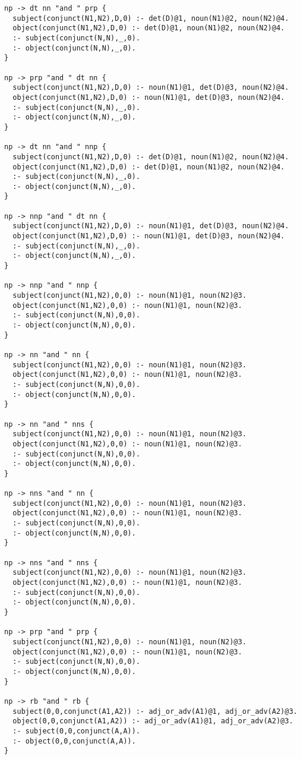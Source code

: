 \begin{lstlisting}
np -> dt nn "and " prp {
  subject(conjunct(N1,N2),D,0) :- det(D)@1, noun(N1)@2, noun(N2)@4.
  object(conjunct(N1,N2),D,0) :- det(D)@1, noun(N1)@2, noun(N2)@4.
  :- subject(conjunct(N,N),_,0).
  :- object(conjunct(N,N),_,0).
}

np -> prp "and " dt nn {
  subject(conjunct(N1,N2),D,0) :- noun(N1)@1, det(D)@3, noun(N2)@4.
  object(conjunct(N1,N2),D,0) :- noun(N1)@1, det(D)@3, noun(N2)@4.
  :- subject(conjunct(N,N),_,0).
  :- object(conjunct(N,N),_,0).
}

np -> dt nn "and " nnp {
  subject(conjunct(N1,N2),D,0) :- det(D)@1, noun(N1)@2, noun(N2)@4.
  object(conjunct(N1,N2),D,0) :- det(D)@1, noun(N1)@2, noun(N2)@4.
  :- subject(conjunct(N,N),_,0).
  :- object(conjunct(N,N),_,0).
}

np -> nnp "and " dt nn {
  subject(conjunct(N1,N2),D,0) :- noun(N1)@1, det(D)@3, noun(N2)@4.
  object(conjunct(N1,N2),D,0) :- noun(N1)@1, det(D)@3, noun(N2)@4.
  :- subject(conjunct(N,N),_,0).
  :- object(conjunct(N,N),_,0).
}

np -> nnp "and " nnp {
  subject(conjunct(N1,N2),0,0) :- noun(N1)@1, noun(N2)@3.
  object(conjunct(N1,N2),0,0) :- noun(N1)@1, noun(N2)@3.
  :- subject(conjunct(N,N),0,0).
  :- object(conjunct(N,N),0,0).
}

np -> nn "and " nn {
  subject(conjunct(N1,N2),0,0) :- noun(N1)@1, noun(N2)@3.
  object(conjunct(N1,N2),0,0) :- noun(N1)@1, noun(N2)@3.
  :- subject(conjunct(N,N),0,0).
  :- object(conjunct(N,N),0,0).
}

np -> nn "and " nns {
  subject(conjunct(N1,N2),0,0) :- noun(N1)@1, noun(N2)@3.
  object(conjunct(N1,N2),0,0) :- noun(N1)@1, noun(N2)@3.
  :- subject(conjunct(N,N),0,0).
  :- object(conjunct(N,N),0,0).
}

np -> nns "and " nn {
  subject(conjunct(N1,N2),0,0) :- noun(N1)@1, noun(N2)@3.
  object(conjunct(N1,N2),0,0) :- noun(N1)@1, noun(N2)@3.
  :- subject(conjunct(N,N),0,0).
  :- object(conjunct(N,N),0,0).
}

np -> nns "and " nns {
  subject(conjunct(N1,N2),0,0) :- noun(N1)@1, noun(N2)@3.
  object(conjunct(N1,N2),0,0) :- noun(N1)@1, noun(N2)@3.
  :- subject(conjunct(N,N),0,0).
  :- object(conjunct(N,N),0,0).
}

np -> prp "and " prp {
  subject(conjunct(N1,N2),0,0) :- noun(N1)@1, noun(N2)@3.
  object(conjunct(N1,N2),0,0) :- noun(N1)@1, noun(N2)@3.
  :- subject(conjunct(N,N),0,0).
  :- object(conjunct(N,N),0,0).
}

np -> rb "and " rb {
  subject(0,0,conjunct(A1,A2)) :- adj_or_adv(A1)@1, adj_or_adv(A2)@3.
  object(0,0,conjunct(A1,A2)) :- adj_or_adv(A1)@1, adj_or_adv(A2)@3.
  :- subject(0,0,conjunct(A,A)).
  :- object(0,0,conjunct(A,A)).
}


\end{lstlisting}
